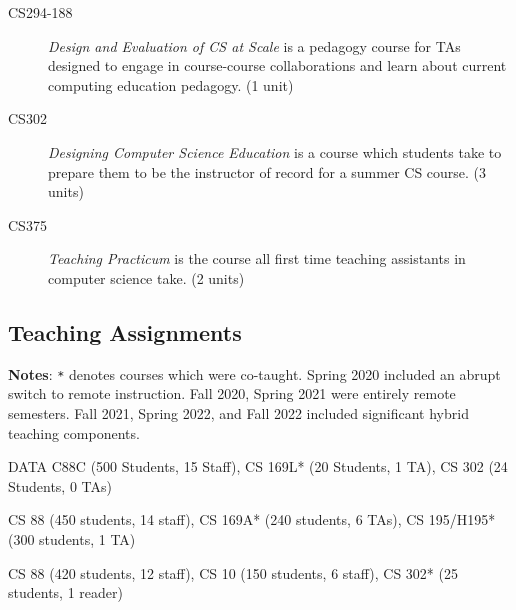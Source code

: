 \begin{description}
    \item[CS294-188] \textit{Design and Evaluation of CS at Scale} is a pedagogy course for TAs designed to engage in course-course collaborations and learn about current computing education pedagogy.  (1 unit)
    \item[CS302] \textit{Designing Computer Science Education} is a course which students take to prepare them to be the instructor of record for a summer CS course. (3 units)
    
    \item[CS375] \textit{Teaching Practicum} is the course all first time teaching assistants in computer science take. (2 units)
\end{description}

\vspace{5pt}

\subsection{Teaching Assignments}

\textbf{Notes}:
\newline
\texttt{*} denotes courses which were co-taught.
\newline
Spring 2020 included an abrupt switch to remote instruction.
\newline
{Fall 2020, Spring 2021 were entirely remote semesters.}
\newline
{Fall 2021, Spring 2022, and Fall 2022 included significant hybrid teaching components.}
\newline


    
    
     {DATA C88C (500 Students, 15 Staff), CS 169L* (20 Students, 1 TA), CS 302 (24 Students, 0 TAs)}
    
     CS 88 (450 students, 14 staff), CS 169A* (240 students, 6 TAs), CS 195/H195* (300 students, 1 TA) 
    
     CS 88 (420 students, 12 staff), CS 10 (150 students, 6 staff), CS 302* (25 students, 1 reader)

